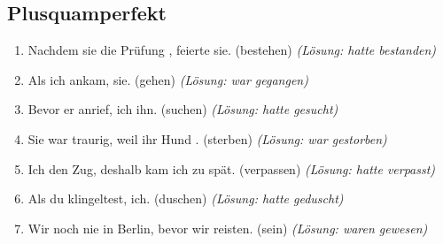 \subsection{Plusquamperfekt}
\begin{enumerate}
    \item Nachdem sie die Prüfung \underline{\hspace{1cm}}, feierte sie. (bestehen) \quad \textit{(Lösung: hatte bestanden)}
    \item Als ich ankam, \underline{\hspace{1cm}} sie. (gehen) \quad \textit{(Lösung: war gegangen)}
    \item Bevor er anrief, \underline{\hspace{1cm}} ich ihn. (suchen) \quad \textit{(Lösung: hatte gesucht)}
    \item Sie war traurig, weil ihr Hund \underline{\hspace{1cm}}. (sterben) \quad \textit{(Lösung: war gestorben)}
    \item Ich \underline{\hspace{1cm}} den Zug, deshalb kam ich zu spät. (verpassen) \quad \textit{(Lösung: hatte verpasst)}
    \item Als du klingeltest, \underline{\hspace{1cm}} ich. (duschen) \quad \textit{(Lösung: hatte geduscht)}
    \item Wir \underline{\hspace{1cm}} noch nie in Berlin, bevor wir reisten. (sein) \quad \textit{(Lösung: waren gewesen)}
\end{enumerate}

